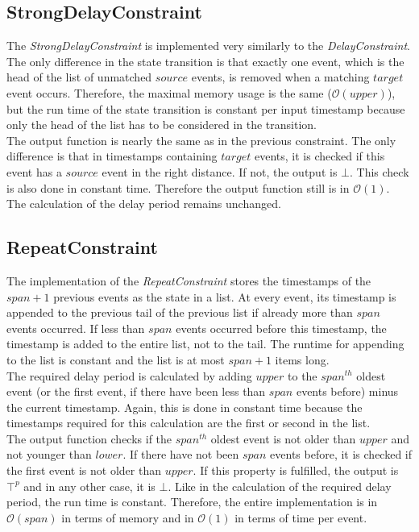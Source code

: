\subsection{StrongDelayConstraint}
	The \emph{StrongDelayConstraint} is implemented very similarly to the \emph{DelayConstraint}. The only difference in the state transition is that exactly one event, which is the head of the list of unmatched $source$ events, is removed when a matching $target$ event occurs. Therefore, the maximal memory usage is the same ($\mathcal{O}(upper)$), but the run time of the state transition is constant per input timestamp because only the head of the list has to be considered in the transition.\\
	The output function is nearly the same as in the previous constraint. The only difference is that in timestamps containing $target$ events, it is checked if this event has a $source$ event in the right distance. If not, the output is $\bot$. This check is also done in constant time. Therefore the output function still is in $\mathcal{O}(1)$. The calculation of the delay period remains unchanged.
	
\subsection{RepeatConstraint}
	The implementation of the \emph{RepeatConstraint} stores the timestamps of the $span+1$ previous events as the state in a list. At every event, its timestamp is appended to the previous tail of the previous list if already more than $span$ events occurred. If less than $span$ events occurred before this timestamp, the timestamp is added to the entire list, not to the tail. The runtime for appending to the list is constant and the list is at most $span+1$ items long.\\
	The required delay period is calculated by adding $upper$ to the  $span^{th}$ oldest event (or the first event, if there have been less than $span$ events before) minus the current timestamp. Again, this is done in constant time because the timestamps required for this calculation are the first or second in the list.\\
	The output function checks if the $span^{th}$ oldest event is not older than $upper$ and not younger than $lower$. If there have not been $span$ events before, it is checked if the first event is not older than $upper$. If this property is fulfilled, the output is $\top^p$ and in any other case, it is $\bot$. Like in the calculation of the required delay period, the run time is constant. Therefore, the entire implementation is in $\mathcal{O}(span)$ in terms of memory and in $\mathcal{O}(1)$ in terms of time per event.
	
